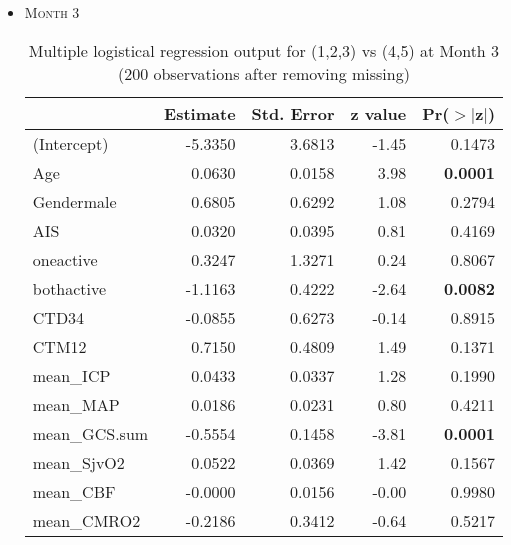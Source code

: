 \documentclass{article}
\begin{document}
\begin{itemize}
\item \textsc{Month 3}
\begin{table}[H]
\centering
\begin{tabular}{lrrrr}
  \hline
 & Estimate & Std. Error & z value & Pr($>$$|$z$|$) \\ 
  \hline
(Intercept) & -5.3350 & 3.6813 & -1.45 & 0.1473 \\ 
  Age & 0.0630 & 0.0158 & 3.98 & {\bf 0.0001} \\ 
  Gendermale & 0.6805 & 0.6292 & 1.08 & 0.2794 \\ 
  AIS & 0.0320 & 0.0395 & 0.81 & 0.4169 \\ 
  oneactive & 0.3247 & 1.3271 & 0.24 & 0.8067 \\ 
  bothactive & -1.1163 & 0.4222 & -2.64 & {\bf 0.0082} \\ 
  CTD34 & -0.0855 & 0.6273 & -0.14 & 0.8915 \\ 
  CTM12 & 0.7150 & 0.4809 & 1.49 & 0.1371 \\ 
  mean\_ICP & 0.0433 & 0.0337 & 1.28 & 0.1990 \\ 
  mean\_MAP & 0.0186 & 0.0231 & 0.80 & 0.4211 \\ 
  mean\_GCS.sum & -0.5554 & 0.1458 & -3.81 & {\bf 0.0001} \\ 
  mean\_SjvO2 & 0.0522 & 0.0369 & 1.42 & 0.1567 \\ 
  mean\_CBF & -0.0000 & 0.0156 & -0.00 & 0.9980 \\ 
  mean\_CMRO2 & -0.2186 & 0.3412 & -0.64 & 0.5217 \\ 
   \hline
\end{tabular}
\caption{Multiple logistical regression output for (1,2,3) vs (4,5) at Month 3 (200 observations after removing missing)}
\end{table}



\end{itemize}
\end{document}
